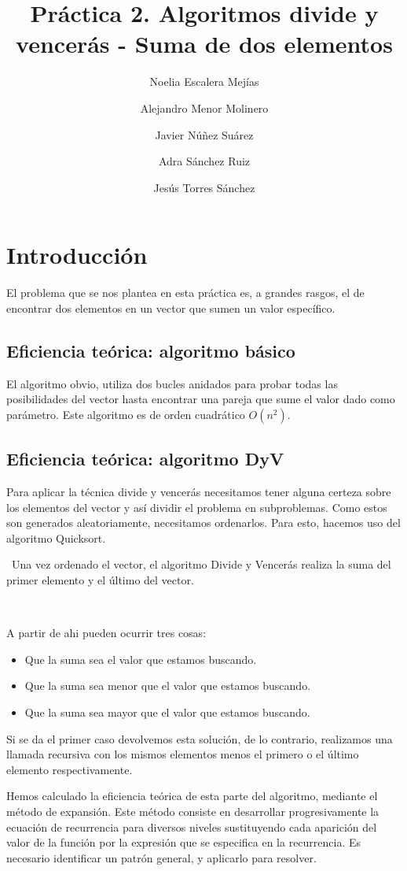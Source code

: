 \documentclass{article}
\title{Práctica 2. Algoritmos divide y vencerás - Suma de dos elementos}
\author{Noelia Escalera Mejías \\
		\and Alejandro Menor Molinero \\
		\and Javier Núñez Suárez \\
		\and Adra Sánchez Ruiz \\
		\and Jesús Torres Sánchez}
\begin{document}
	\maketitle
	\section{Introducción}
	El problema que se nos plantea en esta práctica es, a grandes rasgos, el de encontrar dos elementos en un vector que sumen un valor específico.
	
	
	\subsection{Eficiencia teórica: algoritmo básico}
	
	El algoritmo obvio, utiliza dos bucles anidados para probar todas las posibilidades del vector hasta encontrar una pareja que sume el valor dado como parámetro.
	Este algoritmo es de orden cuadrático $O(n^2)$.
	
	
	\subsection{Eficiencia teórica: algoritmo DyV}
	Para aplicar la técnica divide y vencerás necesitamos tener alguna certeza sobre los elementos del vector y así dividir el problema en subproblemas. Como estos son generados aleatoriamente, necesitamos ordenarlos.
	Para esto, hacemos uso del algoritmo Quicksort.
	
	\
	Una vez ordenado el vector, el algoritmo Divide y Vencerás realiza la suma del primer elemento y el último del vector.
	
	\
	
	A partir de ahi pueden ocurrir tres cosas:
	\begin{itemize}
		\item Que la suma sea el valor que estamos buscando.
		\item Que la suma sea menor que el valor que estamos buscando.
		\item Que la suma sea mayor que el valor que estamos buscando.
	\end{itemize}

	Si se da el primer caso devolvemos esta solución, de lo contrario, realizamos una llamada recursiva con los mismos elementos menos el primero o el último elemento respectivamente.
	\
	
	Hemos calculado la eficiencia teórica de esta parte del algoritmo, mediante el método de expansión. Este método  consiste en desarrollar progresivamente la ecuación de recurrencia para diversos niveles sustituyendo cada aparición del valor de la función por la expresión que se especifica en la recurrencia. Es necesario identificar un patrón general, y aplicarlo para resolver.
	
\end{document}
